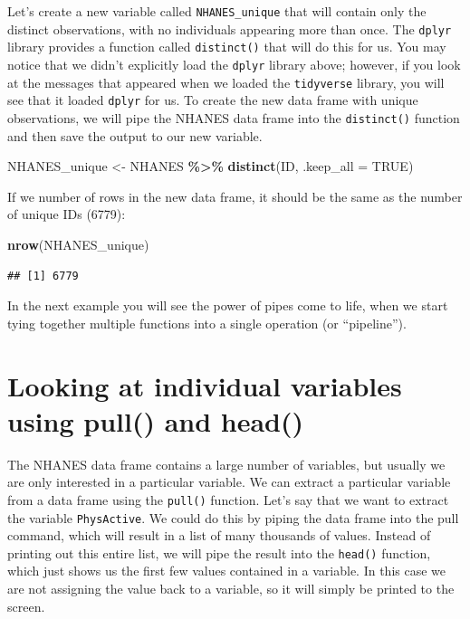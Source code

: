 \documentclass[
  12pt,
]{book}
\newenvironment{Shaded}{\begin{snugshade}}{\end{snugshade}}
\newcommand{\AttributeTok}[1]{\textcolor[rgb]{0.13,0.29,0.53}{#1}}
\newcommand{\ConstantTok}[1]{\textcolor[rgb]{0.56,0.35,0.01}{#1}}
\newcommand{\FunctionTok}[1]{\textcolor[rgb]{0.13,0.29,0.53}{\textbf{#1}}}
\newcommand{\NormalTok}[1]{#1}
\newcommand{\OtherTok}[1]{\textcolor[rgb]{0.56,0.35,0.01}{#1}}
\newcommand{\SpecialCharTok}[1]{\textcolor[rgb]{0.81,0.36,0.00}{\textbf{#1}}}
\begin{document}
Let's create a new variable called \texttt{NHANES\_unique} that will contain only the distinct observations, with no individuals appearing more than once. The \texttt{dplyr} library provides a function called \texttt{distinct()} that will do this for us. You may notice that we didn't explicitly load the \texttt{dplyr} library above; however, if you look at the messages that appeared when we loaded the \texttt{tidyverse} library, you will see that it loaded \texttt{dplyr} for us. To create the new data frame with unique observations, we will pipe the NHANES data frame into the \texttt{distinct()} function and then save the output to our new variable.

\begin{Shaded}
\begin{Highlighting}[]
\NormalTok{NHANES\_unique }\OtherTok{\textless{}{-}} 
\NormalTok{  NHANES }\SpecialCharTok{\%\textgreater{}\%} 
  \FunctionTok{distinct}\NormalTok{(ID, }\AttributeTok{.keep\_all =} \ConstantTok{TRUE}\NormalTok{)}
\end{Highlighting}
\end{Shaded}

If we number of rows in the new data frame, it should be the same as the number of unique IDs (6779):

\begin{Shaded}
\begin{Highlighting}[]
\FunctionTok{nrow}\NormalTok{(NHANES\_unique)}
\end{Highlighting}
\end{Shaded}

\begin{verbatim}
## [1] 6779
\end{verbatim}

In the next example you will see the power of pipes come to life, when we start tying together multiple functions into a single operation (or ``pipeline'').

\hypertarget{looking-at-individual-variables-using-pull-and-head}{%
\section{Looking at individual variables using pull() and head()}\label{looking-at-individual-variables-using-pull-and-head}}

The NHANES data frame contains a large number of variables, but usually we are only interested in a particular variable. We can extract a particular variable from a data frame using the \texttt{pull()} function. Let's say that we want to extract the variable \texttt{PhysActive}. We could do this by piping the data frame into the pull command, which will result in a list of many thousands of values. Instead of printing out this entire list, we will pipe the result into the \texttt{head()} function, which just shows us the first few values contained in a variable. In this case we are not assigning the value back to a variable, so it will simply be printed to the screen.
\end{document}
